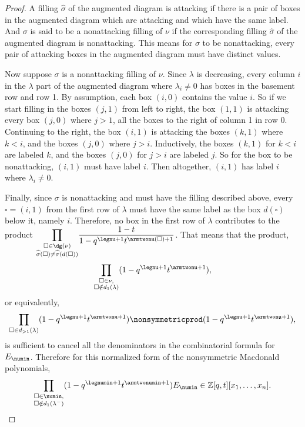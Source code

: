 \begin{proof}
A filling $\widehat{\sigma}$ of the augmented diagram is attacking if there is a pair of boxes in the augmented diagram which are attacking and which have the same label. And $\sigma$ is said to be a nonattacking filling of $\nu$ if the corresponding filling $\widehat{\sigma}$ of the augmented diagram is nonattacking. This means for $\sigma$ to be nonattacking, every pair of attacking boxes in the augmented diagram must have distinct values.

Now suppose $\sigma$ is a nonattacking filling of $\nu$. Since $\lambda$ is decreasing, every column $i$ in the $\lambda$ part of the augmented diagram where $\lambda_i \neq 0$ has boxes in the basement row and row 1. By assumption, each box $(i,0)$ contains the value $i$. So if we start filling in the boxes $(j,1)$ from left to right, the box $(1,1)$ is attacking every box $(j,0)$ where $j>1$, all the boxes to the right of column 1 in row 0. Continuing to the right, the box $(i,1)$ is attacking the boxes $(k,1)$ where $k<i$, and the boxes $(j,0)$ where $j>i$. Inductively, the boxes $(k,1)$ for $k<i$ are labeled $k$, and the boxes $(j,0)$ for $j>i$ are labeled $j$. So for the box to be nonattacking, $(i,1)$ must have label $i$. Then altogether, $(i,1)$ has label $i$ where $\lambda_i \neq 0$.

Finally, since $\sigma$ is nonattacking and must have the filling described above, every $\square = (i,1)$ 
from the first row of $\lambda$ must have the same label as the box $d(\square)$ below it, namely $i$.
Therefore, no box in the first row of $\lambda$ contributes to the product $\displaystyle{\prod\limits_{\substack{\square \in  \dg(\nu) \\ \widehat{\sigma}(\square) \neq \widehat{\sigma}(d(\square))}}} \frac{1-t}{1-q^{\legnu+1} t^{\armtwonu(\square)+1}}$. That means that the product, \[ \prod\limits_{\substack{\square \in \nu, \\ \square \notin d_1(\lambda) }}(1-q^{\legnu+1}t^{\armtwonu + 1}),\] or equivalently, \[\prod\limits_{\square \in d_{>1}(\lambda) }(1-q^{\legnu+1}t^{\armtwonu + 1}) \nonsymmetricprod(1-q^{\legnu+1}t^{\armtwonu + 1}),\] is sufficient to cancel all the denominators in the combinatorial formula for $E_\numin$. Therefore for this normalized form of the nonsymmetric Macdonald polynomials, \[\prod\limits_{\substack{\square \in \numin, \\ \square \notin d_1(\lambda^-) }}(1-q^{\legnumin+1}t^{\armtwonumin + 1}) E_\numin \in \mathbb{Z}[q,t][x_1,\dotsc,x_n].\qedhere\]
\end{proof}


